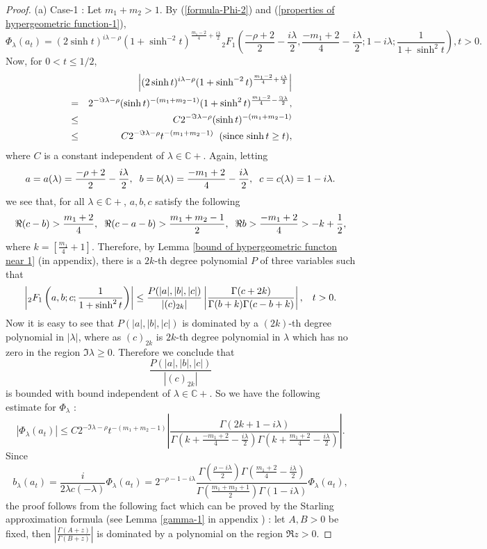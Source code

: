 \documentclass[11pt,reqno]{amsart}
\theoremstyle{definition}
\theoremstyle{definition}
\numberwithin{equation}{section}
\begin{document}
\begin{proof}
(a) Case-1 : Let $m_1+m_2>1$. By (\ref{formula-Phi-2}) and (\ref{properties of hypergeometric 
function-1}),
$$
\Phi_\lambda(a_t)=(2\sinh t)^{i\lambda-\rho}(1+\sinh ^{-2}t)^{\frac{m_1-2}{4}+\frac{i\lambda}{2}}{}_2F_1\left(\frac{-\rho+2}{2}-\frac{i\lambda}{2},\frac{-m_1+2}{4}-\frac{i\lambda}{2};1-i\lambda;\frac{1}{1+\sinh^2 t}\right),t>0.
$$
Now, for $0< t\leq 1/2$,
\begin{eqnarray*}
&&\left|(2\sinh t)^{i\lambda-\rho}(1+\sinh ^{-2}t)^{\frac{m_1-2}{4}+\frac{i\lambda}{2}}\right|\\
&=&  2^{-\Im\lambda-\rho}(\sinh t)^{-(m_1+m_2-1)}(1+\sinh^2t)^{\frac{m_1-2}{4}-\frac{\Im\lambda}{2}},\\
&\leq &C  2^{-\Im\lambda-\rho}(\sinh t)^{-(m_1+m_2-1)}\\
&\leq &C  2^{-\Im\lambda-\rho} t^{-(m_1+m_2-1)}\hspace{2mm}\textup{(since $\sinh t\geq t$)},
\end{eqnarray*}
where $C$ is a constant independent of $\lambda\in\mathbb{C}+$.
Again, letting
$$
a=a(\lambda)=\frac{-\rho+2}{2}-\frac{i\lambda}{2},\hspace{2mm}b=b(\lambda)=\frac{-m_1+2}{4}-\frac{i\lambda}{2},\hspace{2mm}c=c(\lambda)=1-i\lambda.
$$
we see that, for all $\lambda\in \mathbb{C}+$, $a,b,c$ satisfy the following
$$
\Re(c-b)>\frac{m_1+2}{4},\hspace{2mm}\Re(c-a-b)>\frac{m_1+m_2-1}{2},\hspace{2mm}\Re b>\frac{-m_1+2}{4}>-k+\frac{1}{2},
$$
where $k=\left[\frac{m_1}{4}+1\right]$.
Therefore, by Lemma \ref{bound of hypergeometric functon near 1} (in appendix), there is a $2k$-th degree polynomial $P$ of three variables such that 
$$
\left|{}_2F_1\left(a,b;c;\frac{1}{1+\sinh^2 t}\right)\right|\leq \frac{P(|a|,|b|,|c|)}{|(c)_{2k}|}\left|\frac{\Gamma(c+2k)}{\Gamma(b+k)\Gamma(c-b+k)}\right|,\hspace{3mm}t>0.
$$ 
Now it is easy to see that $P(|a|,|b|,|c|)$ is dominated by a $(2k)$-th degree polynomial in $|\lambda|$, where as $(c)_{2k}$ is $2k$-th degree polynomial in $\lambda$ which has no zero in the region $\Im\lambda\geq 0$. Therefore we conclude that
$$
\frac{P(|a|,|b|,|c|)}{|(c)_{2k}|}
$$
is bounded with bound independent of $\lambda\in\mathbb{C}+$. So we have the following estimate for $\Phi_\lambda$ :
$$
|\Phi_\lambda(a_t)|\leq C 2^{-\Im\lambda-\rho} t^{-(m_1+m_2-1)}\left|\frac{\Gamma(2k+1-i\lambda)}{\Gamma(k+\frac{-m_1+2}{4}-\frac{i\lambda}{2})\Gamma(k+\frac{m_1+2}{4}-\frac{i\lambda}{2})}\right|.
$$
Since 
$$
b_\lambda(a_t)=\frac{i}{2\lambda c(-\lambda)}\Phi_\lambda(a_t)= 2^{-\rho-1-i\lambda}\frac{\Gamma(\frac{\rho-i\lambda}{2})\Gamma(\frac{m_1+2}{4}-\frac{i\lambda}{2})}{\Gamma(\frac{m_1+m_2+1}{2})\Gamma(1-i\lambda)}\Phi_\lambda(a_t),
$$
the proof follows from the following fact which can be proved by the Starling approximation formula (see Lemma \ref{gamma-1} in appendix ) : let $A,B>0$ be fixed, then
$
\left|\frac{\Gamma(A+z)}{\Gamma(B+z)}\right|
$
is dominated by a polynomial on the region $\Re z>0$.


\end{proof}
\end{document}
